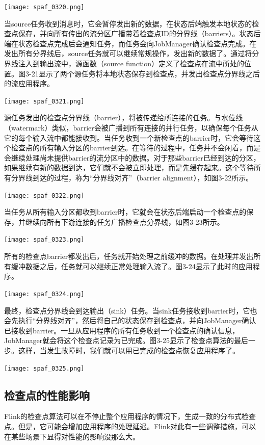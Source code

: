 \documentclass[oneside]{ctexbook}
\begin{document}
\noindent \texttt{[image: spaf\_0320.png]}

当source任务收到消息时，它会暂停发出新的数据，在状态后端触发本地状态的检查点保存，并向所有传出的流分区广播带着检查点ID的分界线（barriers）。状态后端在状态检查点完成后会通知任务，而任务会向JobManager确认检查点完成。在发出所有分界线后，source任务就可以继续常规操作，发出新的数据了。通过将分界线注入到输出流中，源函数（source function）定义了检查点在流中所处的位置。图3-21显示了两个源任务将本地状态保存到检查点，并发出检查点分界线之后的流应用程序。

\noindent \texttt{[image: spaf\_0321.png]}

源任务发出的检查点分界线（barrier），将被传递给所连接的任务。与水位线（watermark）类似，barrier会被广播到所有连接的并行任务，以确保每个任务从它的每个输入流中都能接收到。当任务收到一个新检查点的barrier时，它会等待这个检查点的所有输入分区的barrier到达。在等待的过程中，任务并不会闲着，而是会继续处理尚未提供barrier的流分区中的数据。对于那些barrier已经到达的分区，如果继续有新的数据到达，它们就不会被立即处理，而是先缓存起来。这个等待所有分界线到达的过程，称为“分界线对齐”（barrier alignment），如图3-22所示。

\noindent \texttt{[image: spaf\_0322.png]}

当任务从所有输入分区都收到barrier时，它就会在状态后端启动一个检查点的保存，并继续向所有下游连接的任务广播检查点分界线，如图3-23所示。

\noindent \texttt{[image: spaf\_0323.png]}

所有的检查点barrier都发出后，任务就开始处理之前缓冲的数据。在处理并发出所有缓冲数据之后，任务就可以继续正常处理输入流了。图3-24显示了此时的应用程序。

\noindent \texttt{[image: spaf\_0324.png]}

最终，检查点分界线会到达输出（sink）任务。当sink任务接收到barrier时，它也会先执行“分界线对齐”，然后将自己的状态保存到检查点，并向JobManager确认已接收到barrier。一旦从应用程序的所有任务收到一个检查点的确认信息，JobManager就会将这个检查点记录为已完成。图3-25显示了检查点算法的最后一步。这样，当发生故障时，我们就可以用已完成的检查点恢复应用程序了。

\noindent \texttt{[image: spaf\_0325.png]}

\subsection{检查点的性能影响}

Flink的检查点算法可以在不停止整个应用程序的情况下，生成一致的分布式检查点。但是，它可能会增加应用程序的处理延迟。Flink对此有一些调整措施，可以在某些场景下显得对性能的影响没那么大。
\end{document}
